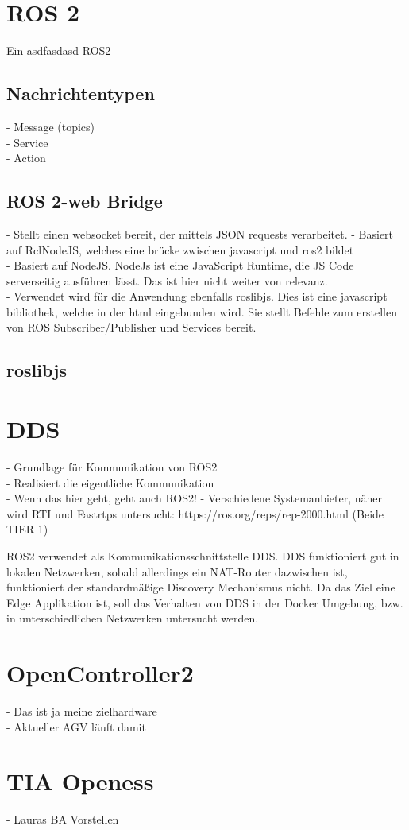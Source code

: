	\section{ROS 2}
	\label{Grundlagen:ROS2}
		Ein asdfasdasd
		\cite{ros2Basic}
		\gls{ROS2}
	
	
	
		\subsection{Nachrichtentypen}
		\label{Grundlagen:ROS2:Nachrichtentypen}
			- Message (topics)\\
			- Service\\
			- Action
			
		\subsection{ROS 2-web Bridge}
		\label{Grundlagen:ROS2:2WebBridge}
			- Stellt einen websocket bereit, der mittels JSON requests verarbeitet. 
			- Basiert auf RclNodeJS, welches eine brücke zwischen javascript und ros2 bildet\\
			- Basiert auf NodeJS. NodeJs ist eine JavaScript Runtime, die JS Code serverseitig ausführen lässt.
			Das ist hier nicht weiter von relevanz.\\
			- Verwendet wird für die Anwendung ebenfalls roslibjs. Dies ist eine javascript bibliothek, welche in der html eingebunden wird. Sie stellt Befehle zum erstellen von ROS Subscriber/Publisher und Services bereit.\\
			
		\subsection{roslibjs}
		\label{Grundlagen:ROS2:RosLibJS}
	
	\section{DDS}
	\label{Grundlagen:DDS}
		- Grundlage für Kommunikation von ROS2\\
		- Realisiert die eigentliche Kommunikation\\
		- Wenn das hier geht, geht auch ROS2!
		- Verschiedene Systemanbieter, näher wird RTI und Fastrtps untersucht: https://ros.org/reps/rep-2000.html  (Beide TIER 1)
		
		ROS2 verwendet als Kommunikationsschnittstelle DDS.
		DDS funktioniert gut in lokalen Netzwerken, sobald allerdings ein NAT-Router dazwischen ist, funktioniert der standardmäßige Discovery Mechanismus nicht.
		Da das Ziel eine Edge Applikation ist, soll das Verhalten von DDS in der Docker Umgebung, bzw. in unterschiedlichen Netzwerken untersucht werden.
	
	\section{OpenController2}
	\label{Grundlagen:OpenController2}
		- Das ist ja meine zielhardware\\
		- Aktueller AGV läuft damit\\
		
	\section{TIA Openess}
	\label{Grundlagen:Fusionierung}
		- Lauras BA Vorstellen\\
		
		
		
